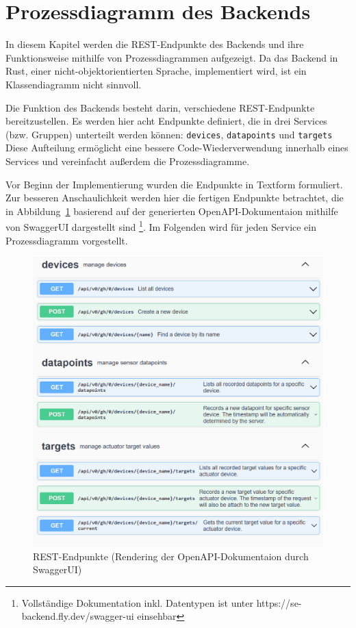 \section{Prozessdiagramm des Backends}
    In diesem Kapitel werden die REST-Endpunkte des Backends und ihre Funktionsweise mithilfe von Prozessdiagrammen aufgezeigt.
    Da das Backend in Rust, einer nicht-objektorientierten Sprache, implementiert wird, ist ein Klassendiagramm nicht sinnvoll.

    Die Funktion des Backends besteht darin, verschiedene REST-Endpunkte bereitzustellen.
    Es werden hier acht Endpunkte definiert, die in drei Services (bzw. Gruppen) unterteilt werden können: \lstinline{devices}, \lstinline{datapoints} und \lstinline{targets}
    Diese Aufteilung ermöglicht eine bessere Code-Wiederverwendung innerhalb eines Services und vereinfacht außerdem die Prozessdiagramme.

    Vor Beginn der Implementierung wurden die Endpunkte in Textform formuliert.
    Zur besseren Anschaulichkeit werden hier die fertigen Endpunkte betrachtet, die in Abbildung~\ref{fig:swagger-endpoints} basierend auf der generierten OpenAPI-Dokumentaion mithilfe von SwaggerUI dargestellt sind
    \footnote{Vollständige Dokumentation inkl. Datentypen ist unter https://se-backend.fly.dev/swagger-ui einsehbar}.
    Im Folgenden wird für jeden Service ein Prozessdiagramm vorgestellt.

    \begin{figure}[H]
        \includegraphics[width=0.95\linewidth]{images/swagger-endpoints.png}
        \centering
        \caption{REST-Endpunkte (Rendering der OpenAPI-Dokumentaion durch SwaggerUI)}
        \label{fig:swagger-endpoints}
    \end{figure}


